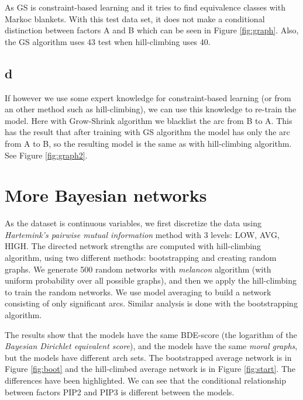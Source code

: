 \documentclass[a4paper,english]{article}
\begin{document}
As GS is constraint-based learning and it tries to find equivalence classes with Markoc blankets. With this test data set, it does not make a conditional distinction between factors A and B which can be seen in Figure \ref{fig:graph}. Also, the GS algorithm uses 43 test when hill-climbing uses 40.

\subsection*{d}
If however we use some expert knowledge for constraint-based learning (or from an other method such as hill-climbing), we can use this knowledge to re-train the model. Here with Grow-Shrink algorithm we blacklist the arc from B to A. This has the result that after training with GS algorithm the model has only the arc from A to B, so the resulting model is the same as with hill-climbing algorithm. See Figure \ref{fig:graph2}.

\section{More Bayesian networks}
As the dataset is continuous variables, we first discretize the data using \emph{Hartemink’s pairwise mutual information} method with 3 levels: LOW, AVG, HIGH. The directed network strengths are computed with hill-climbing algorithm, using two different methods: bootstrapping and creating random graphs. We generate 500 random networks with \emph{melancon} algorithm (with uniform probability over all possible graphs), and then we apply the hill-climbing to train the random networks. We use model averaging to build a network consisting of only significant arcs. Similar analysis is done with the bootstrapping algorithm.

The results show that the models have the same BDE-score (the logarithm of the \emph{Bayesian Dirichlet equivalent score}), and the models have the same \emph{moral graphs}, but the models have different arch sets. The bootstrapped average network is in Figure \ref{fig:boot} and the hill-climbed average network is in Figure \ref{fig:start}. The differences have been highlighted. We can see that the conditional relationship between factors PIP2 and PIP3 is different between the models.
\end{document}
